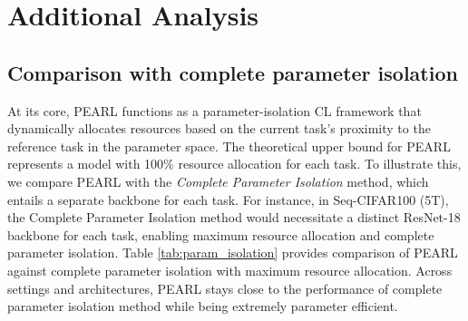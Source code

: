 \documentclass[10pt]{article} %
\begin{document}
\section{Additional Analysis} \label{addition_analysis}

























\subsection{Comparison with complete parameter isolation}
At its core, PEARL functions as a parameter-isolation CL framework that dynamically allocates resources based on the current task's proximity to the reference task in the parameter space. The theoretical upper bound for PEARL represents a model with 100\% resource allocation for each task. To illustrate this, we compare PEARL with the\textit{ Complete Parameter Isolation} method, which entails a separate backbone for each task. For instance, in Seq-CIFAR100 (5T), the Complete Parameter Isolation method would necessitate a distinct ResNet-18 backbone for each task, enabling maximum resource allocation and complete parameter isolation.
Table \ref{tab:param_isolation} provides comparison of PEARL against complete parameter isolation with maximum resource allocation. Across settings and architectures, PEARL stays close to the performance of complete parameter isolation method while being extremely parameter efficient. 
\end{document}
